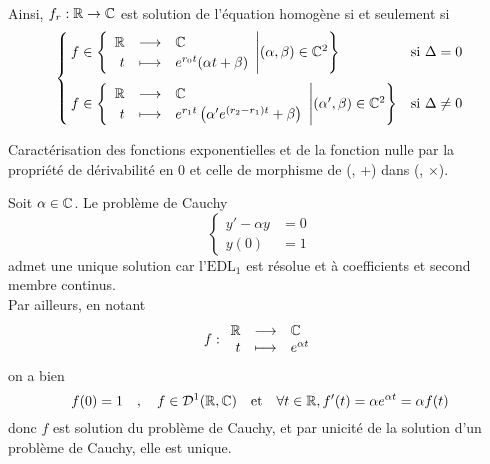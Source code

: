 \documentclass{article}
\renewenvironment{question_kholle}[2][ ]
{
	\subsection{\texorpdfstring{#2}{}}
	\notblank{#1}
	{
		\noindent #1
		\bigbreak
	}
	{}
	\begin{proof}
}
{
	\end{proof}
}
\begin{document}
\begin{question_kholle}
\begin{align*}
	\end{align*}
	Ainsi, $f_{r}:\mathbb R\rightarrow\mathbb C$ est solution de l'équation homogène si et seulement si
	\[
		\begin{cases}
			f\in \left\{\begin{array}{rcl} \mathbb R & \longrightarrow & \mathbb C \\ t & \longmapsto & e^{r_{0}t}(\alpha t+\beta) \end{array} \middle| (\alpha, \beta)\in\mathbb C^{2}\right\}                                 & \text{si $\Delta=0$}     \\[15pt]
			f\in \left\{\begin{array}{rcl} \mathbb R & \longrightarrow & \mathbb C \\ t & \longmapsto & e^{r_{1}t}\left(\alpha ' e^{(r_{2}-r_{1})t}+\beta\right) \end{array} \middle| (\alpha ', \beta)\in\mathbb C^{2}\right\} & \text{si $\Delta\neq 0$}
		\end{cases}
	\]
\end{question_kholle}

\begin{question_kholle}[{
				\begin{propositions}
					\item \textit{Comme solution d’un problème de Cauchy.} Soit $\alpha\in\C$.
					\[
						\applic{\R}{\C}{t}{e^{\alpha t}} \text{ est l’unique solution de } \begin{cases}
							y'-\alpha y & =0 \\
							y(0)        & =1
						\end{cases}
					\]
					\item \textit{Par la propriété de morphisme et de non-annulation.}
					\begin{multline}
						\left\{f:\R\longrightarrow\C \middle| f \text{ dérivable en 0 et } \forall (s,u)\in\R^{2}, f(s+u)=f(s)f(u)\right\} \\=\{\widetilde{0}\}\cup \left\{\applic{\R}{\C}{t}{e^{\alpha t}}\middle| \alpha\in\C\right\}
					\end{multline}
				\end{propositions}
			}]{Caractérisation des fonctions exponentielles et de la fonction nulle par la propriété de dérivabilité en 0 et celle de morphisme de (\R, +) dans (\C, $\times$).}
	\begin{propositions}
		\item Soit $\alpha\in\C$. Le problème de Cauchy
		\[
			\begin{cases}
				y'-\alpha y & =0 \\
				y(0)        & =1
			\end{cases}
		\]
		admet une unique solution car l’$\mathrm{EDL_{1}}$ est résolue et à coefficients et second membre continus.\\
		Par ailleurs, en notant
		\[
			f:\begin{array}{rcl} \mathbb R & \longrightarrow & \mathbb C \\ t & \longmapsto & e^{\alpha t} \end{array}
		\]
		on a bien
		\[
			f(0)=1 \quad , \quad f\in\mathcal{D}^{1}(\mathbb R,\mathbb C) \quad\text{et}\quad \forall t\in\mathbb R, f'(t)=\alpha e^{\alpha t}=\alpha f(t)
		\]
		donc $f$ est solution du problème de Cauchy, et par unicité de la solution d’un problème de Cauchy, elle est unique.


\end{propositions}
\end{question_kholle}
\end{document}
